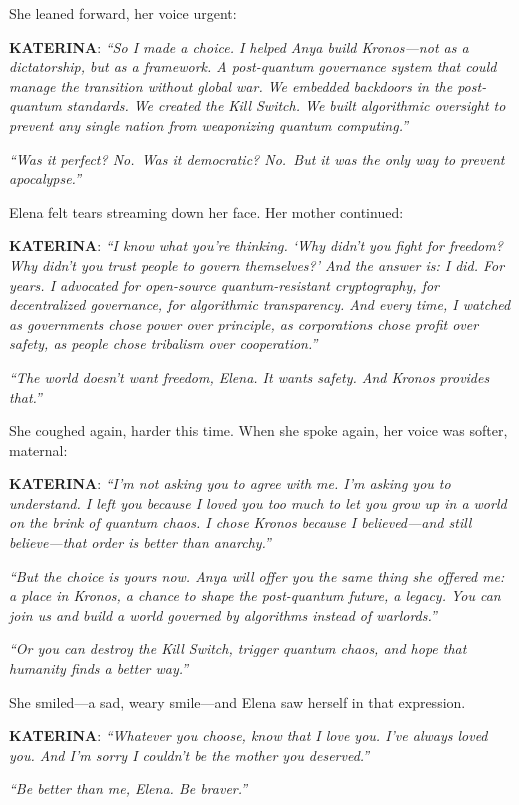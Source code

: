 She leaned forward, her voice urgent:

\textbf{KATERINA}: \emph{``So I made a choice. I helped Anya build Kronos---not as a dictatorship, but as a framework. A post-quantum governance system that could manage the transition without global war. We embedded backdoors in the post-quantum standards. We created the Kill Switch. We built algorithmic oversight to prevent any single nation from weaponizing quantum computing.''}

\emph{``Was it perfect? No.~Was it democratic? No.~But it was the only way to prevent apocalypse.''}

Elena felt tears streaming down her face. Her mother continued:

\textbf{KATERINA}: \emph{``I know what you're thinking. `Why didn't you fight for freedom? Why didn't you trust people to govern themselves?' And the answer is: I did. For years. I advocated for open-source quantum-resistant cryptography, for decentralized governance, for algorithmic transparency. And every time, I watched as governments chose power over principle, as corporations chose profit over safety, as people chose tribalism over cooperation.''}

\emph{``The world doesn't want freedom, Elena. It wants safety. And Kronos provides that.''}

She coughed again, harder this time. When she spoke again, her voice was softer, maternal:

\textbf{KATERINA}: \emph{``I'm not asking you to agree with me. I'm asking you to understand. I left you because I loved you too much to let you grow up in a world on the brink of quantum chaos. I chose Kronos because I believed---and still believe---that order is better than anarchy.''}

\emph{``But the choice is yours now. Anya will offer you the same thing she offered me: a place in Kronos, a chance to shape the post-quantum future, a legacy. You can join us and build a world governed by algorithms instead of warlords.''}

\emph{``Or you can destroy the Kill Switch, trigger quantum chaos, and hope that humanity finds a better way.''}

She smiled---a sad, weary smile---and Elena saw herself in that expression.

\textbf{KATERINA}: \emph{``Whatever you choose, know that I love you. I've always loved you. And I'm sorry I couldn't be the mother you deserved.''}

\emph{``Be better than me, Elena. Be braver.''}

